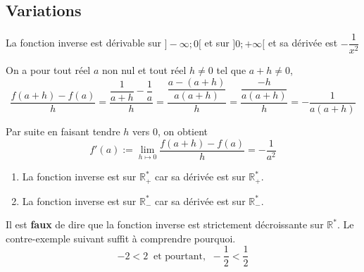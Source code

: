 \documentclass[french]{book}
\begin{document}
\subsection{Variations}

\begin{prop}
La fonction inverse est dérivable sur $]-\infty ; 0[$ et sur $] 0 ;+\infty[$ et sa dérivée est $-\dfrac{1}{x^2}$
\end{prop}
 
\begin{demo}
On a pour tout réel $a$ non nul et tout réel $h \neq 0$ tel que $a+h \neq 0$, 
$$\dfrac{f(a+h)-f(a)}{h}=\dfrac{\dfrac{1}{a+h}-\dfrac{1}{a}}{h}=\dfrac{\dfrac{a-(a+h)}{a(a+h)}}{h}=\dfrac{\dfrac{-h}{a(a+h)}}{h}=-\dfrac{1}{a(a+h)}$$

Par suite en faisant tendre $h$ vers $0$, on obtient $$f'(a):=\lim_{h\mapsto0} \dfrac{f(a+h)-f(a)}{h}=-\dfrac{1}{a^2}$$
\end{demo}

\begin{prop}
\begin{enumerate}
\item La fonction inverse est  sur $\mathbb{R}_+^*$ car sa dérivée est  sur $\mathbb{R}_+^*$.

\item La fonction inverse est  sur $\mathbb{R}_-^*$ car sa dérivée est  sur $\mathbb{R}_-^*$.
\end{enumerate}
\end{prop}

\begin{attention}
Il est \textbf{faux} de dire que la fonction inverse est strictement décroissante sur $\mathbb{R}^*$. Le contre-exemple suivant suffit à comprendre pourquoi. 
$$-2<2 \;\; \textrm{et pourtant,} \;\; -\dfrac{1}{2} < \dfrac{1}{2}$$ 
\end{attention}

\end{document}
